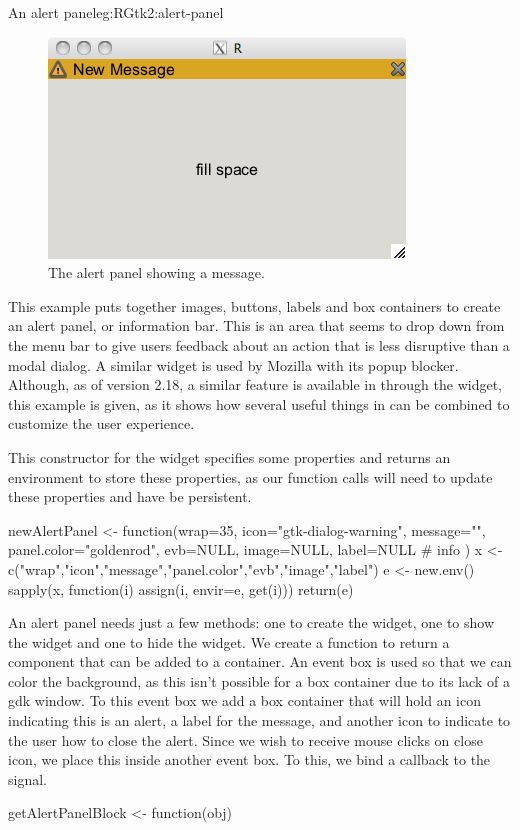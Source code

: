 \begin{example}{An alert panel}{eg:RGtk2:alert-panel}


\begin{figure}
  \centering
  \includegraphics[width=.45\textwidth]{ex-RGtk2-alert-panel}
  \caption{The alert panel showing a message.}
  \label{fig:RGtk2-alert-panel}
\end{figure}

This example puts together images, buttons, labels and box containers
to create an alert panel, or information bar. This is an area that
seems to drop down from the menu bar to give users feedback about an
action that is less disruptive than a modal dialog. A similar widget
is used by Mozilla with its popup blocker. Although, as of version
2.18, a similar feature is available in \GTK\/ through the
 widget, this example is given, as it shows how
several useful things in \GTK\/ can be combined to customize the user
experience.

This constructor for the widget specifies some properties and returns
an environment to store these properties, as our function calls will
need to update these properties and have be persistent.
\begin{Schunk}
\begin{Sinput}
 newAlertPanel <- function(wrap=35,
                           icon="gtk-dialog-warning",
                           message="",
                           panel.color="goldenrod",
                           evb=NULL,
                           image=NULL,
                           label=NULL # info
                     ) {
   x <- c("wrap","icon","message","panel.color","evb","image","label")
   e <- new.env()
   sapply(x, function(i) assign(i, envir=e, get(i)))
   return(e)
 }
\end{Sinput}
\end{Schunk}

An alert panel needs just a few methods: one to create the widget, one
to show the widget and one to hide the widget. We create a function
 to return a component that can be added to a
container. An event box is used so that we can color the background,
as this isn't possible for a box container due to its lack of a gdk
window.  To this event box we add a box container that will hold an
icon indicating this is an alert, a label for the message, and another
icon to indicate to the user how to close the alert. Since we wish to
receive mouse clicks on close icon, we place this inside another event
box. To this, we bind a callback to the  signal.
\begin{Schunk}
\begin{Sinput}
 getAlertPanelBlock <- function(obj) {
 
}
\end{Sinput}
\end{Schunk}
\end{example}
